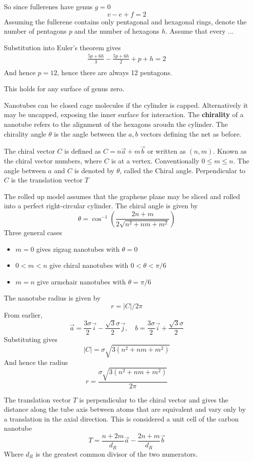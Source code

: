 \documentclass{X:/Documents/Coding/Latex/myassignment}
\begin{document}
So since fullerenes have genus $g=0$
\[v - e +f =2\]
Assuming the fullerene contains only pentagonal and hexagonal rings, denote the number of pentagons $p$ and the number of hexagons $h$. Assume that every
...

Substitution into Euler's theorem gives
\begin{align*}
	\frac{5p + 6h}{3} - \frac{5p + 6h}{2} + p + h = 2\\
\end{align*}
And hence $p=12$, hence there are always 12 pentagons.

This holds for any surface of genus zero.

Nanotubes can be closed cage molecules if the cylinder is capped. Alternatively it may be uncapped, exposing the inner surface for interaction.
The \textbf{chirality} of a nanotube refers to the alignment of the hexagons aroudn the cylinder.
The chirality angle $\theta$ is the angle between the $a,b$ vectors defining the net as before.

The chiral vector $C$ is defined as $C = n\vec a + m\vec b$ or written as $(n,m)$. Known as the chiral vector numbers, where $C$ is at a vertex.
Conventionally $0\leq m\leq n$.
The angle between $a$ and $C$ is denoted by $\theta$, called the Chiral angle.
Perpendicular to $C$ is the translation vector $T$

The rolled up model assumes that the graphene plane may be sliced and rolled into a perfect right-circular cylinder. The chiral angle is given by
\[\theta = \cos^{-1}\left(\frac{2n+m}{2\sqrt{n^2 + nm + m^2}}\right)\]
Three general cases
\begin{itemize}
	\item $m=0$ gives zigzag nanotubes with $\theta =0$
	\item $0<m<n$ give chiral nanotubes with $0<\theta<\pi/6$
	\item $m=n$ give armchair nanotubes with $\theta = \pi/6$
\end{itemize}
The nanotube radius is given by
\[r = |C|/2\pi\]
From earlier,
\[\vec a = \frac{3\sigma}{2} \vec i - \frac{\sqrt{3}\sigma}{2} \vec j , \quad b =\frac{3\sigma}{2} \vec i + \frac{\sqrt{3}\sigma}{2}  \]
Substituting gives
\[|C| = \sigma\sqrt{3(n^2+nm+m^2)}\]
And hence the radius
\[r = \frac{\sigma\sqrt{3(n^2+nm+m^2)}}{2\pi}\]

The translation vector $T$ is perpendicular to the chiral vector and gives the distance along the tube axis between atoms that are equivalent and vary only by a translation in the axial direction. This is considered a unit cell of the carbon nanotube
\[T = \frac{n+2m}{d_R} \vec a - \frac{2n +m}{d_R} \vec b\]
Where $d_R$ is the greatest common divisor of the two numerators.
\end{document}
